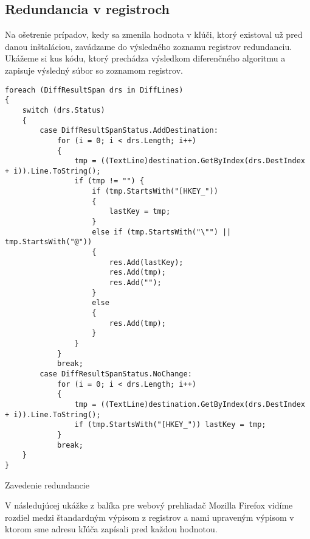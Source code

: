 \subsection{Redundancia v registroch}
Na ošetrenie prípadov, kedy sa zmenila hodnota v kľúči, ktorý existoval už pred danou inštaláciou, zavádzame do výsledného zoznamu registrov redundanciu. Ukážeme si kus kódu, ktorý prechádza výsledkom diferenčného algoritmu a zapisuje výsledný súbor so zoznamom registrov.
\begin{listing}
\begin{verbatim}
foreach (DiffResultSpan drs in DiffLines)
{
    switch (drs.Status)
    {
        case DiffResultSpanStatus.AddDestination:
            for (i = 0; i < drs.Length; i++)
            {
                tmp = ((TextLine)destination.GetByIndex(drs.DestIndex + i)).Line.ToString();
                if (tmp != "") {
                    if (tmp.StartsWith("[HKEY_"))
                    {
                        lastKey = tmp;
                    }
                    else if (tmp.StartsWith("\"") || tmp.StartsWith("@")) 
                    {
                        res.Add(lastKey);
                        res.Add(tmp);
                        res.Add("");
                    }
                    else 
                    {
                        res.Add(tmp);
                    }
                }
            }
            break;
        case DiffResultSpanStatus.NoChange:
            for (i = 0; i < drs.Length; i++)
            {
                tmp = ((TextLine)destination.GetByIndex(drs.DestIndex + i)).Line.ToString();
                if (tmp.StartsWith("[HKEY_")) lastKey = tmp;
            }
            break;
    }
}
\end{verbatim}
\caption{Zavedenie redundancie}
\label{lst:regredun}
\end{listing}

V následujúcej ukážke z balíka pre webový prehliadač Mozilla Firefox vidíme rozdiel medzi štandardným výpisom z registrov a nami upraveným výpisom v ktorom sme adresu kľúča zapísali pred každou hodnotou.


